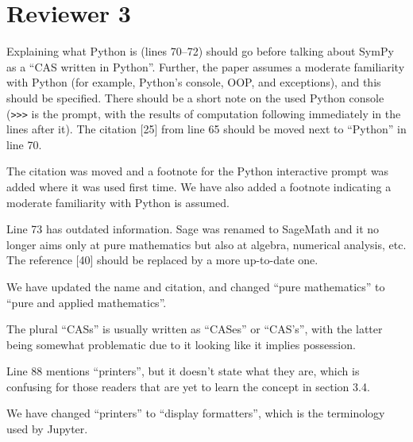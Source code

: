 \documentclass[answers,12pt]{exam}
\begin{document}
\section{Reviewer 3}

\begin{questions}

\question Explaining what Python is (lines 70--72) should go before talking about SymPy as a ``CAS written in Python''. Further, the paper assumes a moderate familiarity with Python (for example, Python's console, OOP, and exceptions), and this should be specified. There should be a short note on the used Python console (\texttt{>>>} is the prompt, with the results of computation following immediately in the lines after it). The citation [25] from line 65 should be moved next to ``Python'' in line 70.
\begin{solution}
  The citation was moved and a footnote for the Python interactive prompt was
  added where it was used first time. We have also added a footnote indicating
  a moderate familiarity with Python is assumed.
\end{solution}

\question Line 73 has outdated information. Sage was renamed to SageMath and it no longer aims only at pure mathematics but also at algebra, numerical analysis, etc. The reference [40] should be replaced by a more up-to-date one.
\begin{solution}
We have updated the name and citation, and changed ``pure mathematics'' to
``pure and applied mathematics''.
\end{solution}

\question The plural ``CASs'' is usually written as ``CASes'' or ``CAS's'', with the latter being somewhat problematic due to it looking like it implies possession.
\begin{solution}
\end{solution}

\question Line 88 mentions ``printers'', but it doesn't state what they are, which is confusing for those readers that are yet to learn the concept in section 3.4.
\begin{solution}
We have changed ``printers'' to ``display formatters'', which is the
terminology used by Jupyter.
\end{solution}


\end{questions}
\end{document}
